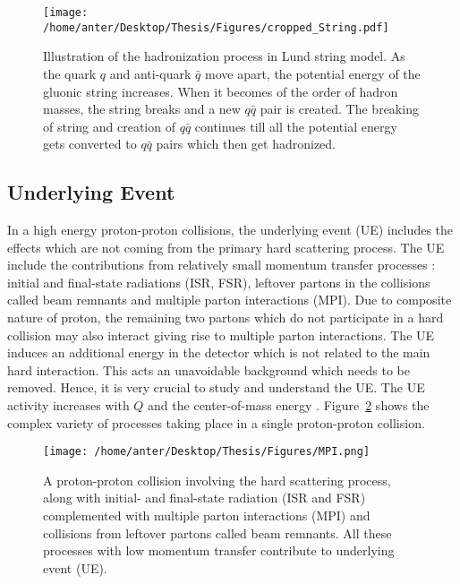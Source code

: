 \begin{figure}[!h]
\begin{center}
\hspace*{-4mm}
\texttt{[image: /home/anter/Desktop/Thesis/Figures/cropped\_String.pdf]}\\
\vspace*{4mm}
\caption[Illustration of the hadronization process in Lund string model.]{Illustration of the hadronization process in Lund string model\footnotemark. As the quark $q$ and anti-quark $\bar{q}$ move apart, the potential energy of the gluonic string increases. When it becomes of the order of hadron masses, the string breaks and a new $q\bar{q}$ pair is created. The breaking of string and creation of $q\bar{q}$ continues till all the potential energy gets converted to $q\bar{q}$ pairs which then get hadronized.}
\label{fig:string}
\end{center}
\end{figure}

\subsection{Underlying Event}
In a high energy proton-proton collisions, the underlying event (UE) includes the effects which are not coming from the primary hard scattering process. The UE include the contributions from relatively small momentum transfer processes : initial and final-state radiations (ISR, FSR), leftover partons in the collisions called beam remnants and multiple parton interactions (MPI). Due to composite nature of proton, the remaining two partons which do not participate in a hard collision may also interact giving rise to multiple parton interactions. The UE induces an additional energy in the detector which is not related to the main hard interaction. This acts an unavoidable background which needs to be removed. Hence, it is very crucial to study and understand the UE. The UE activity increases with $Q$ and the center-of-mass energy \cme. Figure~\ref{fig:MPI} shows the complex variety of processes taking place in a single proton-proton collision.

\begin{figure}[!h]
\begin{center}
\hspace*{-7mm}
\texttt{[image: /home/anter/Desktop/Thesis/Figures/MPI.png]}\\
\vspace*{4mm}
\caption[Proton-proton collision.]{A proton-proton collision involving the hard scattering process, along with initial- and final-state radiation (ISR and FSR) complemented with multiple parton interactions (MPI) and collisions from leftover partons called beam remnants. All these processes with low momentum transfer contribute to underlying event (UE)\footnotemark.}
\label{fig:MPI}
\end{center}
\end{figure}

